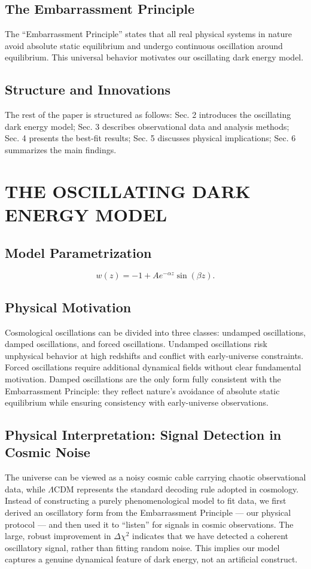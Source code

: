 \documentclass[10pt,twocolumn]{article}
\begin{document}
\subsection{The Embarrassment Principle}
The ``Embarrassment Principle'' states that all real physical systems in nature avoid absolute static equilibrium and undergo continuous oscillation around equilibrium. This universal behavior motivates our oscillating dark energy model.

\subsection{Structure and Innovations}
The rest of the paper is structured as follows: Sec. 2 introduces the oscillating dark energy model; Sec. 3 describes observational data and analysis methods; Sec. 4 presents the best-fit results; Sec. 5 discusses physical implications; Sec. 6 summarizes the main findings.

\section{THE OSCILLATING DARK ENERGY MODEL}
\subsection{Model Parametrization}
\begin{equation}
w(z) = -1 + A e^{-\alpha z} \sin(\beta z).
\end{equation}

\subsection{Physical Motivation}
Cosmological oscillations can be divided into three classes: undamped oscillations, damped oscillations, and forced oscillations.
Undamped oscillations risk unphysical behavior at high redshifts and conflict with early-universe constraints.
Forced oscillations require additional dynamical fields without clear fundamental motivation.
Damped oscillations are the only form fully consistent with the Embarrassment Principle: they reflect nature's avoidance of absolute static equilibrium while ensuring consistency with early-universe observations.

\subsection{Physical Interpretation: Signal Detection in Cosmic Noise}
The universe can be viewed as a noisy cosmic cable carrying chaotic observational data,
while $\Lambda$CDM represents the standard decoding rule adopted in cosmology.
Instead of constructing a purely phenomenological model to fit data,
we first derived an oscillatory form from the Embarrassment Principle — our physical protocol —
and then used it to ``listen'' for signals in cosmic observations.
The large, robust improvement in $\Delta\chi^2$ indicates that we have detected a coherent oscillatory signal,
rather than fitting random noise. This implies our model captures a genuine dynamical feature of dark energy,
not an artificial construct.
\end{document}
